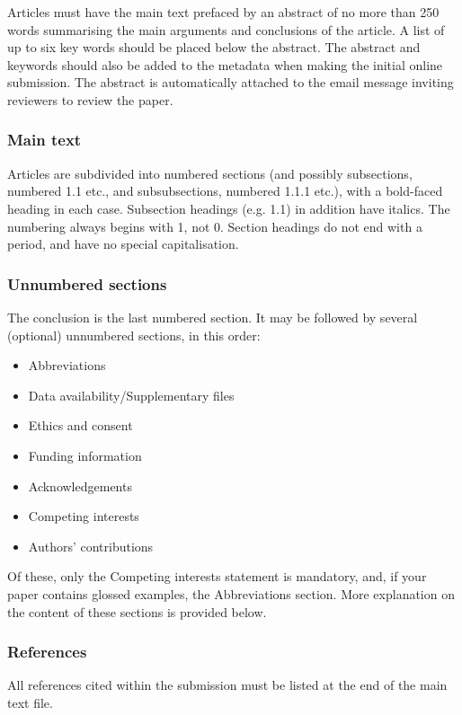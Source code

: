 \documentclass[charis,linguex]{glossa}
\begin{document}
Articles must have the main text prefaced by an abstract of no more than 250 words summarising the main arguments and conclusions of the article. A list of up to six key words should be placed below the abstract. The abstract and keywords should also be added to the metadata when making the initial online submission. The abstract is automatically attached to the email message inviting reviewers to review the paper.

\subsubsection{Main text}

Articles are subdivided into numbered sections (and possibly subsections, numbered 1.1 etc., and subsubsections, numbered 1.1.1 etc.), with a bold-faced heading in each case. Subsection headings (e.g. 1.1) in addition have italics. The numbering always begins with 1, not 0. Section headings do not end with a period, and have no special capitalisation.

\subsubsection{Unnumbered sections}
The conclusion is the last numbered section. It may be followed by several (optional) unnumbered sections, in this order: 
\begin{itemize}
\item Abbreviations
\item Data availability/Supplementary files
\item Ethics and consent
\item Funding information
\item Acknowledgements
\item Competing interests
\item Authors' contributions
\end{itemize}

\noindent Of these, only the Competing interests statement is mandatory, and, if your paper contains glossed examples, the Abbreviations section. More explanation on the content of these sections is provided below.

\subsubsection{References}
All references cited within the submission must be listed at the end of the main text file.
\end{document}
